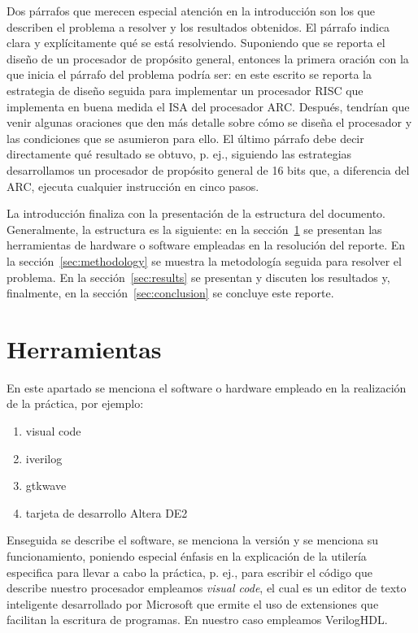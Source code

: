 \documentclass[12pt]{article}
\begin{document}
Dos párrafos que merecen especial atención en la introducción son los que 
describen el problema a resolver y los resultados obtenidos. El párrafo indica 
clara y explícitamente qué se está resolviendo. Suponiendo que se reporta el 
diseño de un procesador de propósito general, entonces la primera oración con 
la que inicia el párrafo del problema podría ser: en este escrito se reporta la 
estrategia de diseño seguida para implementar un procesador RISC que implementa 
en buena medida el ISA del procesador ARC. Después, tendrían que venir algunas 
oraciones que den más detalle sobre cómo se diseña el procesador y las 
condiciones que se asumieron para ello. El último párrafo debe decir 
directamente qué resultado se obtuvo, p. ej., siguiendo las estrategias 
desarrollamos un procesador de propósito general de 16 bits que, a diferencia 
del ARC, ejecuta cualquier instrucción en cinco pasos.

La introducción finaliza con la presentación de la estructura del documento. 
Generalmente, la estructura es la siguiente: en la sección~\ref{sec:tools} se 
presentan las herramientas de hardware o software empleadas en la resolución 
del reporte. En la sección~\ref{sec:methodology} se muestra la metodología 
seguida para resolver el problema. En la sección~\ref{sec:results} se 
presentan y discuten los resultados y, finalmente, en la 
sección~\ref{sec:conclusion} se concluye este reporte.


\section{Herramientas}\label{sec:tools}

En este apartado se menciona el software o hardware empleado en la realización 
de la práctica, por ejemplo:
\begin{enumerate}
    \item visual code
    \item iverilog
    \item gtkwave
    \item tarjeta de desarrollo Altera DE2
\end{enumerate}

Enseguida se describe el software, se menciona la versión y se menciona su 
funcionamiento, poniendo especial énfasis en la explicación de la utilería 
especifica para llevar a cabo la práctica, p. ej., para escribir el código que 
describe nuestro procesador empleamos \textit{visual code}, el cual es un editor 
de texto inteligente desarrollado por Microsoft que ermite el uso de extensiones 
que facilitan la escritura de programas. En nuestro caso empleamos VerilogHDL.
\end{document}
